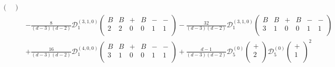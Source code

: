 \begin{equation}
\begin{split}
\begin{pmatrix}
\end{pmatrix} \\
&-\frac{8}{(d-3)(d-2)}\mathcal{D}_1^{(3,1,0)}
\begin{pmatrix}
B & B & + & B & - & - \\
2 & 2 & 0 & 0 & 1 & 1  \\
\end{pmatrix}
-\frac{32}{(d-3)(d-2)}\mathcal{D}_1^{(3,1,0)}
\begin{pmatrix}
B & B & + & B & - & - \\
3 & 1 & 0 & 0 & 1 & 1  \\
\end{pmatrix} \\
&+\frac{16}{(d-3)(d-2)}\mathcal{D}_1^{(4,0,0)}
\begin{pmatrix}
B & B & + & B & - & - \\
3 & 1 & 0 & 0 & 1 & 1  \\
\end{pmatrix}
+\frac{d-1}{(d-3)(d-2)}\mathcal{D}_5^{(0)}
\begin{pmatrix}
+ \\
2 \\
\end{pmatrix}
\mathcal{D}_5^{(0)}
\begin{pmatrix}
+ \\
1 \\
\end{pmatrix}^2
\end{split}
\end{equation}

